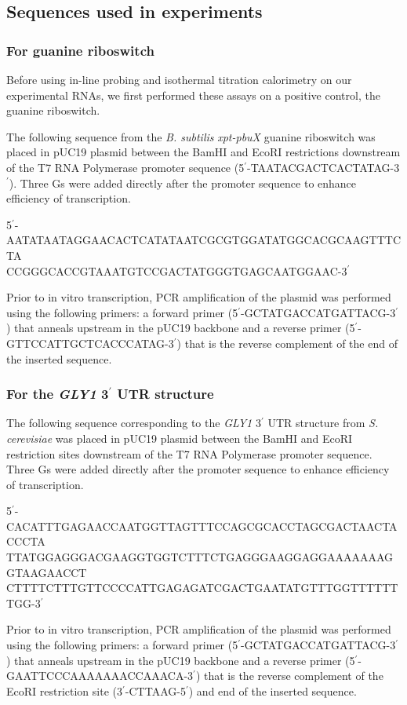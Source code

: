 \documentclass[12pt]{report}
\begin{document}
\subsection{Sequences used in experiments}

\subsubsection{For guanine riboswitch}
Before using in-line probing and isothermal titration calorimetry on our experimental RNAs, we first performed these assays on a positive control, the guanine riboswitch. 

The following sequence from the \textit{B. subtilis} \textit{xpt-pbuX} guanine riboswitch was placed in pUC19 plasmid between the BamHI and EcoRI restrictions downstream of the T7 RNA Polymerase promoter sequence (5$^\prime$-TAATACGACTCACTATAG-3$^\prime$). Three Gs were added directly after the promoter sequence to enhance efficiency of transcription.

5$^\prime$-AATATAATAGGAACACTCATATAATCGCGTGGATATGGCACGCAAGTTTCTA\\CCGGGCACCGTAAATGTCCGACTATGGGTGAGCAATGGAAC-3$^\prime$

Prior to in vitro transcription, PCR amplification of the plasmid was performed using the following primers: a forward primer (5$^\prime$-GCTATGACCATGATTACG-3$^\prime$) that anneals upstream in the pUC19 backbone and a reverse primer (5$^\prime$-GTTCCATTGCTCACCCATAG-3$^\prime$) that is the reverse complement of the end of the inserted sequence. 

\subsubsection{For the \textit{GLY1} 3$^\prime$ UTR structure}

The following sequence corresponding to the \textit{GLY1} 3$^\prime$ UTR structure from \textit{S. cerevisiae} was placed in pUC19 plasmid between the BamHI and EcoRI restriction sites downstream of the T7 RNA Polymerase promoter sequence. Three Gs were added directly after the promoter sequence to enhance efficiency of transcription.

5$^\prime$-
CACATTTGAGAACCAATGGTTAGTTTCCAGCGCACCTAGCGACTAACTACCCTA\\
TTATGGAGGGACGAAGGTGGTCTTTCTGAGGGAAGGAGGAAAAAAAGGTAAGAACCT\\
CTTTTCTTTGTTCCCCATTGAGAGATCGACTGAATATGTTTGGTTTTTTTGG-3$^\prime$

Prior to in vitro transcription, PCR amplification of the plasmid was performed using the following primers: a forward primer (5$^\prime$-GCTATGACCATGATTACG-3$^\prime$) that anneals upstream in the pUC19 backbone and a reverse primer (5$^\prime$-GAATTCCCAAAAAAACCAAACA-3$^\prime$) that is the reverse complement of the EcoRI restriction site (3$^\prime$-CTTAAG-5$^\prime$) and end of the inserted sequence.
\end{document}

